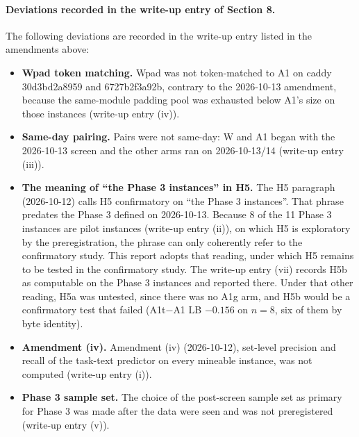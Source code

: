 \paragraph{Deviations recorded in the write-up entry of Section 8.} The following deviations are recorded in the write-up entry listed in the amendments above:
\begin{itemize}
\item \textbf{Wpad token matching.} Wpad was not token-matched to A1 on caddy 30d3bd2a8959 and 6727b2f3a92b, contrary to the 2026-10-13 amendment, because the same-module padding pool was exhausted below A1's size on those instances (write-up entry (iv)).
\item \textbf{Same-day pairing.} Pairs were not same-day: W and A1 began with the 2026-10-13 screen and the other arms ran on 2026-10-13/14 (write-up entry (iii)).
\item \textbf{The meaning of ``the Phase 3 instances'' in H5.} The H5 paragraph (2026-10-12) calls H5 confirmatory on ``the Phase 3 instances''. That phrase predates the Phase 3 defined on 2026-10-13. Because 8 of the 11 Phase 3 instances are pilot instances (write-up entry (ii)), on which H5 is exploratory by the preregistration, the phrase can only coherently refer to the confirmatory study. This report adopts that reading, under which H5 remains to be tested in the confirmatory study. The write-up entry (vii) records H5b as computable on the Phase 3 instances and reported there. Under that other reading, H5a was untested, since there was no A1g arm, and H5b would be a confirmatory test that failed (A1t$-$A1 LB $-0.156$ on $n=8$, six of them by byte identity).
\item \textbf{Amendment (iv).} Amendment (iv) (2026-10-12), set-level precision and recall of the task-text predictor on every mineable instance, was not computed (write-up entry (i)).
\item \textbf{Phase 3 sample set.} The choice of the post-screen sample set as primary for Phase 3 was made after the data were seen and was not preregistered (write-up entry (v)).
\end{itemize}

